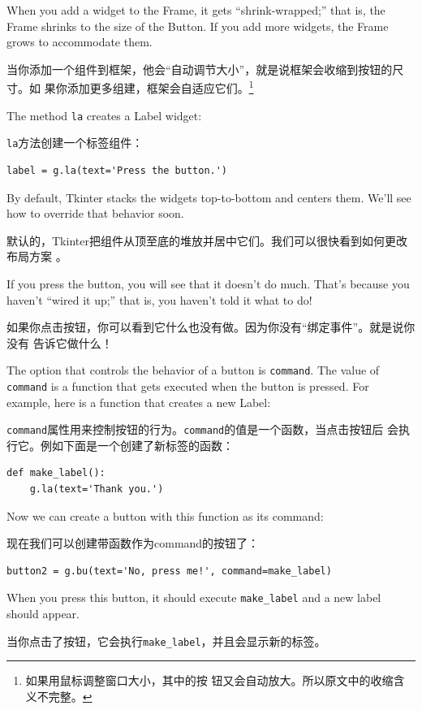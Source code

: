 \documentclass[10pt]{book}
\begin{document}
\begin{CJK}{UTF8}{gbsn}
When you add a widget to the Frame, it gets ``shrink-wrapped;''
that is, the Frame shrinks to the size of the Button.  If you
add more widgets, the Frame grows to accommodate them.

当你添加一个组件到框架，他会``自动调节大小''，就是说框架会收缩到按钮的尺寸。如
果你添加更多组建，框架会自适应它们。\footnote{如果用鼠标调整窗口大小，其中的按
钮又会自动放大。所以原文中的收缩含义不完整。}

The method {\tt la} creates a Label widget:

{\tt la}方法创建一个标签组件：

\begin{verbatim}
label = g.la(text='Press the button.')
\end{verbatim}
%
By default, Tkinter stacks the widgets top-to-bottom and centers
them.  We'll see how to override that behavior soon.

默认的，Tkinter把组件从顶至底的堆放并居中它们。我们可以很快看到如何更改布局方案
。

If you press the button, you will see that it doesn't do much.
That's because you haven't ``wired it up;'' that is, you haven't
told it what to do!

如果你点击按钮，你可以看到它什么也没有做。因为你没有``绑定事件''。就是说你没有
告诉它做什么！

The option that controls the behavior of a button is {\tt command}.
The value of {\tt command} is a function that gets executed when
the button is pressed.  For example, here is a function that creates
a new Label:

{\tt command}属性用来控制按钮的行为。{\tt command}的值是一个函数，当点击按钮后
会执行它。例如下面是一个创建了新标签的函数：

\begin{verbatim}
def make_label():
    g.la(text='Thank you.')
\end{verbatim}
%
Now we can create a button with this function as its command:

现在我们可以创建带函数作为command的按钮了：

\begin{verbatim}
button2 = g.bu(text='No, press me!', command=make_label)
\end{verbatim}
%
When you press this button, it should execute \verb"make_label"
and a new label should appear.

当你点击了按钮，它会执行\verb"make_label"，并且会显示新的标签。


\end{CJK}
\end{document}
